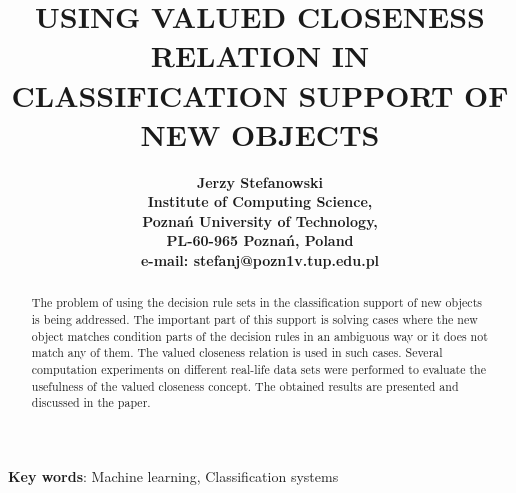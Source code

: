 %
%

\textheight=22.0cm
\textwidth=17.0cm

\addtolength{\oddsidemargin}{-0.7in}
\addtolength{\evensidemargin}{-0.7in}
\columnsep=0.25in
\def\baselinestretch{0.9}

\pagestyle{empty}

\small

\title{\bf USING VALUED CLOSENESS RELATION IN
CLASSIFICATION SUPPORT OF NEW OBJECTS}

\author{\bf
Jerzy Stefanowski\\
Institute of Computing Science, \\
Pozna\'n University of Technology, \\
PL-60-965 Pozna\'n, Poland \\
e-mail: stefanj@pozn1v.tup.edu.pl}

\date{}




\protect\pagestyle{empty}
\thispagestyle{empty}

\maketitle


\noindent
{\bf Key words}: Machine learning, Classification systems

\begin{abstract}
\thispagestyle{empty}
The problem of using the decision rule sets in the classification
 support of new objects is being addressed. The important part of this
support is solving cases where the new object matches condition parts
of the decision rules in an ambiguous way or it does not match any of
them. The valued closeness relation is used in such cases. Several
computation experiments on different real-life data sets were performed
to evaluate the usefulness of the valued closeness concept. The obtained
results are presented and discussed in the paper.
\end{abstract}

